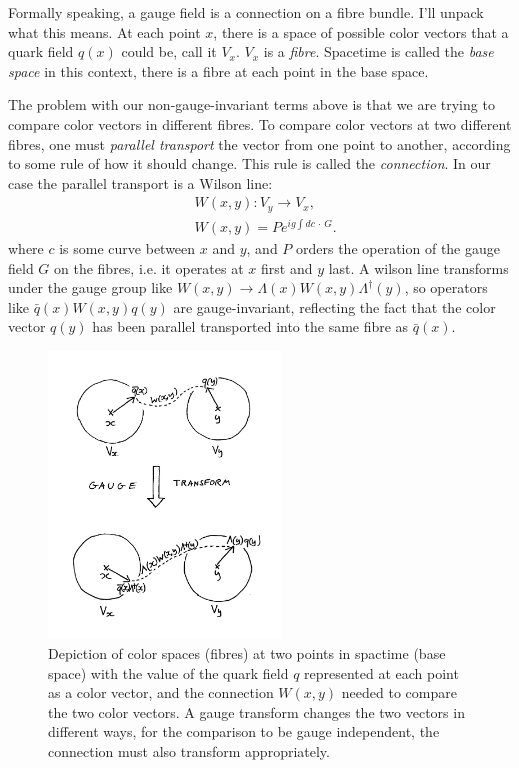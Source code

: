 Formally speaking, a gauge field is a connection on a fibre bundle. I'll unpack what this means. At each point $x$, there is a space of possible color vectors that a quark field $q(x)$ could be, call it $V_x$. $V_x$ is a {\it{fibre}}. Spacetime is called the {\it{base space}} in this context, there is a fibre at each point in the base space.

The problem with our non-gauge-invariant terms above is that we are trying to compare color vectors in different fibres. To compare color vectors at two different fibres, one must {\it{parallel transport}} the vector from one point to another, according to some rule of how it should change. This rule is called the {\it{connection}}. In our case the parallel transport is a Wilson line:
\begin{align}
  \nonumber  &W(x,y) : V_y \to V_x, \\ &W(x,y) = Pe^{ig\int dc\,\cdot\, G }.
\end{align}
where $c$ is some curve between $x$ and $y$, and $P$ orders the operation of the gauge field $G$ on the fibres, i.e. it operates at $x$ first and $y$ last. A wilson line transforms under the gauge group like $W(x,y)\to \Lambda(x)W(x,y)\Lambda^{\dagger}(y)$, so operators like $\bar{q}(x)W(x,y)q(y)$ are gauge-invariant, reflecting the fact that the color vector $q(y)$ has been parallel transported into the same fibre as $\bar{q}(x)$.

\begin{figure}[htb!]
  \begin{center}
    \vspace{-10pt}
    \includegraphics[width=0.55\textwidth]{images/fibres.jpg}
    \caption{Depiction of color spaces (fibres) at two points in spactime (base space) with the value of the quark field $q$ represented at each point as a color vector, and the connection $W(x,y)$ needed to compare the two color vectors. A gauge transform changes the two vectors in different ways, for the comparison to be gauge independent, the connection must also transform appropriately.}
  \end{center}
  \vspace{-10pt}
\end{figure}

